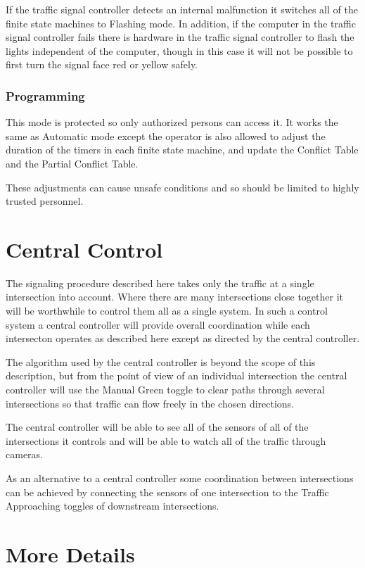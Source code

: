 \documentclass[letterpaper,twoside]{article}
\begin{document}
If the traffic signal controller detects an internal malfunction it switches
all of the finite state machines to Flashing mode.
In addition, if the computer in the traffic
signal controller fails there is hardware in the traffic signal
controller to flash the lights independent of the computer,
though in this case it will not be possible to first turn the
signal face red or yellow safely.

\subsubsection{Programming}

This mode is protected so only authorized persons can access it.
It works the same as Automatic mode except the operator is also allowed to
adjust the duration of the timers in each finite state machine, and update the
Conflict Table and the Partial Conflict Table.

These adjustments can cause unsafe conditions and so should be limited
to highly trusted personnel.

\section{Central Control}

The signaling procedure described here takes only the traffic at a single
intersection into account.  Where there are many intersections close
together it will be worthwhile to control them all as a single system.
In such a control system a central controller will provide overall
coordination while each intersecton operates as described here except as
directed by the central controller.

The algorithm used by the central controller is beyond the scope of this
description, but from the point of view of an individual intersection
the central controller will use the Manual Green toggle to clear paths
through several intersections so that traffic can flow freely in the
chosen directions.

The central controller will be able to see all of the sensors of all
of the intersections it controls and will be able to watch all of
the traffic through cameras.

As an alternative to a central controller some coordination between
intersections can be achieved by connecting the sensors of one intersection
to the Traffic Approaching toggles of downstream intersections.

\section{More Details}
\end{document}
